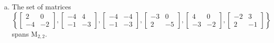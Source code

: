 \begin{exerciseAnswer}
\begin{enumerate}[(a)]
\item The set of matrices \( \left\{ \left[\begin{array}{cc}
2 & 0 \\
-4 & -2
\end{array}\right] , \left[\begin{array}{cc}
-4 & 4 \\
-1 & -3
\end{array}\right] , \left[\begin{array}{cc}
-4 & -4 \\
-1 & -3
\end{array}\right] , \left[\begin{array}{cc}
-3 & 0 \\
2 & -5
\end{array}\right] , \left[\begin{array}{cc}
4 & 0 \\
-3 & -2
\end{array}\right] , \left[\begin{array}{cc}
-2 & 3 \\
2 & -1
\end{array}\right] \right\} \) spans \(\mathrm{M}_{2,2}\). 
\end{enumerate}
    
\end{exerciseAnswer}
    
